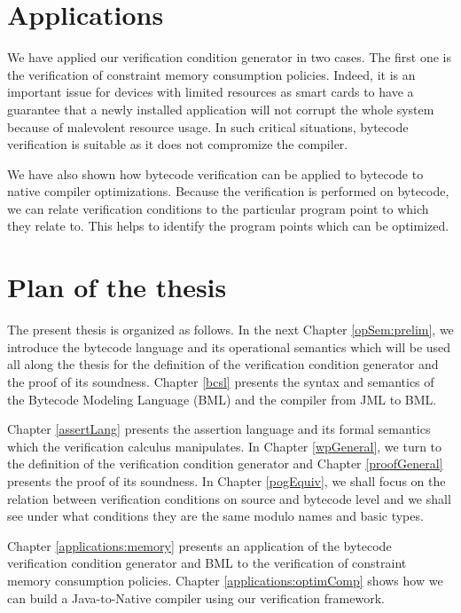 \section{Applications}
We have applied our verification condition generator in two cases. The first one is the verification of constraint memory consumption policies.
 Indeed, it is an important issue for devices with limited resources as smart cards to have a guarantee that a newly installed application 
will not corrupt the whole system because of malevolent resource usage. In such critical situations, bytecode verification is suitable
as it does not compromize the compiler. 


We have also shown how bytecode verification can be applied to  bytecode to native compiler optimizations. Because the verification is performed
on bytecode, we can relate verification conditions to the particular program point to which they relate to. This helps to identify
the program points which can be optimized. 




\section{Plan of the thesis}


The present thesis is organized as follows. In the next Chapter \ref{opSem:prelim}, we introduce
 the bytecode language and its operational semantics which will be used all along the thesis for the definition of the verification condition generator and the proof
of its soundness. 
Chapter \ref{bcsl} presents the syntax and semantics of the Bytecode Modeling Language (BML) and the compiler from JML to BML. 

Chapter \ref{assertLang} presents the assertion language and its formal semantics which the verification calculus manipulates. 
In Chapter \ref{wpGeneral}, we turn to the definition of the verification condition generator and Chapter \ref{proofGeneral}
 presents the proof of its soundness. In Chapter \ref{pogEquiv}, we shall focus on the relation between 
verification conditions on source and bytecode level and we shall see under what conditions they are the same modulo names and basic types.
   
Chapter \ref{applications:memory} presents an application of the bytecode verification condition generator and BML to the verification of constraint memory consumption
policies. Chapter \ref{applications:optimComp} shows how we can build a Java-to-Native compiler using our verification framework.




